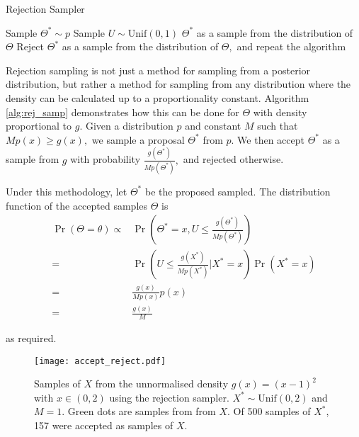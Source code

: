 \begin{algorithm}[htbp]
    \caption{Rejection Sampler}
    \label{alg:rej_samp}
    \begin{algorithmic}
        \State Sample $\Theta^\ast \sim p$
        \State Sample $U \sim \mathrm{Unif}(0, 1)$
        \State \Return $\Theta^\ast$ as a sample from the distribution of
        $\Theta$
        \Else
        \State Reject $\Theta^\ast$ as a sample from the distribution of
        $\Theta,$ and repeat the algorithm
        \EndIf
    \end{algorithmic}
\end{algorithm}

Rejection sampling is not just a method for sampling from a posterior
distribution, but rather a method for sampling from any distribution
where the density can
be calculated up to a proportionality constant.
Algorithm \ref{alg:rej_samp}
demonstrates how this can be done for $\Theta$ with density proportional to
$g.$ Given a distribution $p$ and constant $M$ such that $Mp(x) \geq g(x),$ we
sample a proposal $\Theta^\ast$ from $p.$ We then accept $\Theta^\ast$ as a
sample from $g$ with probability $\frac{g(\Theta^\ast)}{M p(\Theta^\ast)},$ and
rejected otherwise.

Under this methodology, let $\Theta^\ast$ be the proposed sampled.
The distribution function of the accepted samples $\Theta$ is
\begin{align*}
    \Pr(\Theta = \theta)
    \propto & \Pr\left(
    \Theta^\ast = x , U \leq \frac{g(\Theta^\ast)}{M p(\Theta^\ast)}
    \right)
    \tag{where the probabilities may be interpreted as densities} \\
    =       & \Pr\left(
    U \leq \frac{g(X^\ast)}{M p(X^\ast)} | X^\ast = x\right) \Pr(X^\ast = x
    )                                                             \\
    =       & \frac{g(x)}{M p(x)} p(x)                            \\
    =       & \frac{g(x)}{M}
\end{align*}

as required.

\begin{figure}
    \centering
    \texttt{[image: accept\_reject.pdf]}
    \caption{
        Samples of $X$ from the unnormalised density $g(x) = (x - 1)^2$ with
        $x\in(0,2)$ using the rejection sampler. $X^\ast\sim\mathrm{Unif}(0,2)$
        and $M = 1.$
        Green dots are samples from
        from $X.$
        Of 500 samples of $X^\ast$, 157 were accepted as samples of $X$.
    }
    \label{fig:accept_reject}
\end{figure}

